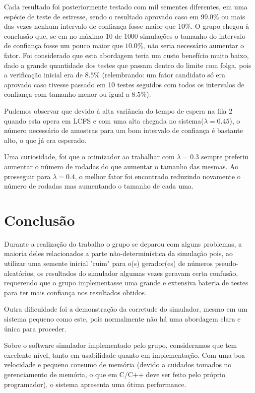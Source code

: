 \documentclass[a4paper,10pt]{article}
\begin{document}
Cada resultado foi  posteriormente testado com mil sementes diferentes, em uma espécie de teste de estresse, sendo o resultado aprovado caso em $99.0\%$ ou mais das vezes nenhum intervalo de confiança fosse maior que $10\%$. O grupo chegou à conclusão que, se em no máximo 10 de 1000 simulações o tamanho do intervalo de confiança fosse um pouco maior que $10.0\%$, não seria necessário aumentar o fator. Foi considerado que esta abordagem teria um custo benefício muito baixo, dado a grande quantidade dos testes que passam dentro do limite com folga, pois a verificação inicial era de $8.5\%$ (relembrando: um fator candidato só era aprovado caso tivesse passado em 10 testes seguidos com todos os intervalos de confiança com tamanho menor ou igual a $8.5\%$).

Pudemos observar que devido à alta variância do tempo de espera na fila 2 quando esta opera em LCFS e com uma alta chegada no sistema($\lambda = 0.45$), o número necessário de amostras para um bom intervalo de confiança é bastante alto, o que já era esperado.

Uma curiosidade, foi que o otimizador ao trabalhar com $\lambda = 0.3$ sempre preferiu aumentar o número de rodadas do que aumentar o tamanho das mesmas. Ao prosseguir para $\lambda = 0.4$, o melhor fator foi encontrado reduzindo novamente o número de rodadas mas aumentando o tamanho de cada uma.


\pagebreak

\section{Conclusão}

    Durante a realização do trabalho o grupo se deparou com alguns problemas, a maioria deles relacionados a parte não-determinística da simulação pois, ao utilizar uma semente inicial "ruim" para o(s) gerador(es) de números pseudo-aleatórios, os resultados do simulador algumas vezes geravam certa confusão, requerendo que o grupo implementasse uma grande e extensiva bateria de testes para ter mais confiança nos resultados obtidos.

    Outra dificuldade foi a demonstração da corretude do simulador, mesmo em um sistema pequeno como este, pois normalmente não há uma abordagem clara e única para proceder.

    Sobre o software simulador implementado pelo grupo, consideramos que tem excelente nível, tanto em usabilidade quanto em implementação. Com uma boa velocidade e pequeno consumo de memória (devido a cuidados tomados no gerenciamento de memória, o que em C/C++ deve ser feito pelo próprio programador), o sistema apresenta uma ótima performance.
\end{document}
